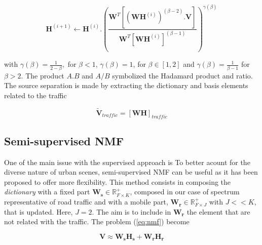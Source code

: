 \documentclass[twocolumn,a4paper,10pt]{article}
\begin{document}
\begin{equation}
\textbf{H}^{(i+1)} \leftarrow \textbf{H}^{(i)}.\left(\frac{\textbf{W}^T \left[\left(\textbf{WH}^{(i)} \right)^{(\beta-2)}.\textbf{V} \right]}{\textbf{W}^T \left[\textbf{WH}^{(i)} \right]^{(\beta-1)}}\right)^{\gamma(\beta)}
\end{equation}

with $\gamma(\beta) = \frac{1}{2-\beta},$ for $\beta < 1$, $ \gamma(\beta) = 1$, for $\beta \in \left[1,2\right]$ and $\gamma(\beta) = \frac{1}{\beta-1}$ for $\beta > 2$. The product $A.B$ and $A/B$ symbolized the Hadamard product and ratio. The source separation is made by extracting the dictionary and basis elements related to the traffic

\begin{equation}\label{eq:separationExtraction}
\mathbf{\tilde{V}}_{traffic} = \left[ \mathbf{WH} \right]_{traffic}
\end{equation}

%
%
%

\subsection{Semi-supervised NMF}

One of the main issue with the supervised approach is To better acount for the diverse nature of urban scenes, semi-supervised NMF can be useful as it has been proposed \cite{lee_semi-supervised_2010}  to offer more flexibility. This method consists in composing the \textit{dictionary} with a fixed part $\mathbf{W_s} \in \mathbb{R}^+_{F\times K}$, composed in our case of spectrum representative of road traffic and with a mobile part, $\mathbf{W_r} \in \mathbb{R}^+_{F\times J}$ with $J <<K$, that is updated. Here, $J = 2$. The aim is to include in $\mathbf{W_r}$ the element that are not related with the traffic. The problem (\ref{eq:nmf}) become

\begin{equation}
\mathbf{V} \approx \mathbf{W_s H_s}+ \mathbf{W_r H_r}
\end{equation}
\end{document}

